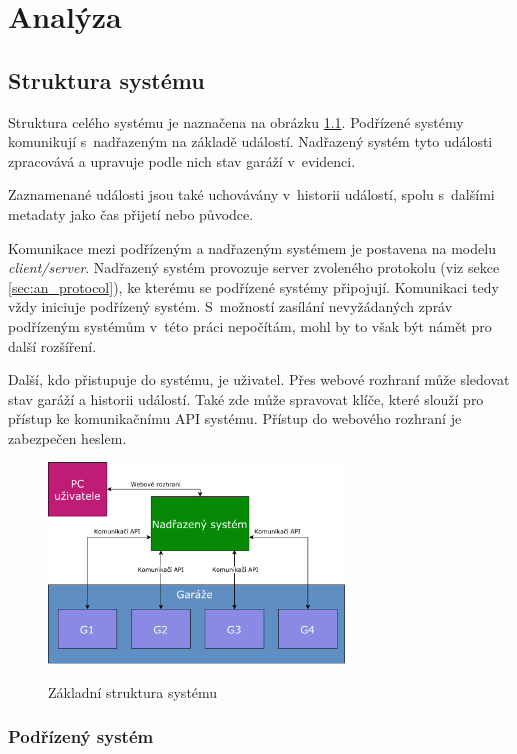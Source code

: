\chapter{Analýza}
\label{sec:an}

\section{Struktura systému}
\label{sec:an_struct}

Struktura celého systému je naznačena na obrázku \ref{fig:basic_struct}. Podřízené systémy komunikují s~nadřazeným na základě událostí. Nadřazený systém tyto události zpracovává a upravuje podle nich stav garáží v~evidenci. 

Zaznamenané události jsou také uchovávány v~historii událostí, spolu s~dalšími metadaty jako čas přijetí nebo původce.

Komunikace mezi podřízeným a nadřazeným systémem je postavena na modelu \textit{client/server}. Nadřazený systém provozuje server zvoleného protokolu (viz sekce \ref{sec:an_protocol}), ke kterému se podřízené systémy připojují. Komunikaci tedy vždy iniciuje podřízený systém. S~možností zasílání nevyžádaných zpráv podřízeným systémům v~této práci nepočítám, mohl by to však být námět pro další rozšíření.

Další, kdo přistupuje do systému, je uživatel. Přes webové rozhraní může sledovat stav garáží a historii událostí. Také zde může spravovat klíče, které slouží pro přístup ke komunikačnímu API systému. Přístup do webového rozhraní je zabezpečen heslem.

\begin{figure}[h!]
    \centering
    \includegraphics[width=0.7\textwidth]{images/basic_struct.pdf}
    \label{fig:basic_struct}
    \caption{Základní struktura systému}
\end{figure}

\subsection{Podřízený systém}

